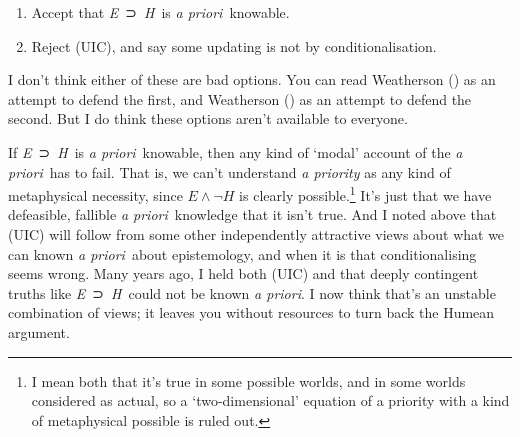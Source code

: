 \documentclass[
  10pt,
  letterpaper,
  DIV=11,
  numbers=noendperiod,
  twoside]{scrartcl}
\begin{document}
\begin{enumerate}
\def\labelenumi{\arabic{enumi}.}
\item
  Accept that \emph{E}~⊃~\emph{H}~is \emph{a priori}~knowable.
\item
  Reject (UIC), and say some updating is not by conditionalisation.
\end{enumerate}

I don't think either of these are bad options. You can read Weatherson
() as an attempt to defend the first,
and Weatherson () as an attempt to
defend the second. But I do think these options aren't available to
everyone.

If \emph{E}~⊃~\emph{H}~is \emph{a priori}~knowable, then any kind of
`modal' account of the \emph{a priori}~has to fail. That is, we can't
understand \emph{a priority} as any kind of metaphysical necessity,
since \(E \wedge \neg H\) is clearly possible.\footnote{I mean both that
  it's true in some possible worlds, and in some worlds considered as
  actual, so a `two-dimensional' equation of a priority with a kind of
  metaphysical possible is ruled out.} It's just that we have
defeasible, fallible \emph{a priori}~knowledge that it isn't true. And I
noted above that (UIC) will follow from some other independently
attractive views about what we can known \emph{a priori}~about
epistemology, and when it is that conditionalising seems wrong. Many
years ago, I held both (UIC) and that deeply contingent truths like
\emph{E}~⊃~\emph{H}~could not be known \emph{a priori}. I now think
that's an unstable combination of views; it leaves you without resources
to turn back the Humean argument.
\end{document}

